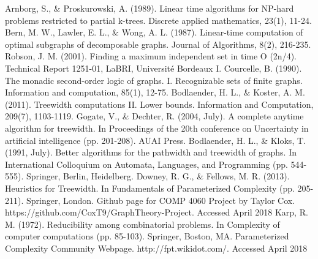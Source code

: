 \documentclass[12pt,conference]{IEEEtran}
\theoremstyle{plain}
\begin{document}
\begin{thebibliography}{1}
 Arnborg, S., \& Proskurowski, A. (1989). Linear time algorithms for NP-hard problems restricted to partial k-trees. Discrete applied mathematics, 23(1), 11-24.
 Bern, M. W., Lawler, E. L., \& Wong, A. L. (1987). Linear-time computation of optimal subgraphs of decomposable graphs. Journal of Algorithms, 8(2), 216-235.
 Robson, J. M. (2001). Finding a maximum independent set in time O (2n/4). Technical Report 1251-01, LaBRI, Université Bordeaux I.
 Courcelle, B. (1990). The monadic second-order logic of graphs. I. Recognizable sets of finite graphs. Information and computation, 85(1), 12-75.
 Bodlaender, H. L., \& Koster, A. M. (2011). Treewidth computations II. Lower bounds. Information and Computation, 209(7), 1103-1119.
 Gogate, V., \& Dechter, R. (2004, July). A complete anytime algorithm for treewidth. In Proceedings of the 20th conference on Uncertainty in artificial intelligence (pp. 201-208). AUAI Press.
 Bodlaender, H. L., \& Kloks, T. (1991, July). Better algorithms for the pathwidth and treewidth of graphs. In International Colloquium on Automata, Languages, and Programming (pp. 544-555). Springer, Berlin, Heidelberg.
 Downey, R. G., \& Fellows, M. R. (2013). Heuristics for Treewidth. In Fundamentals of Parameterized Complexity (pp. 205-211). Springer, London.
 Github page for COMP 4060 Project by Taylor Cox. https://github.com/CoxT9/GraphTheory-Project. Accessed April 2018
 Karp, R. M. (1972). Reducibility among combinatorial problems. In Complexity of computer computations (pp. 85-103). Springer, Boston, MA.
 Parameterized Complexity Community Webpage. http://fpt.wikidot.com/. Accessed April 2018
\end{thebibliography}
\end{document}
